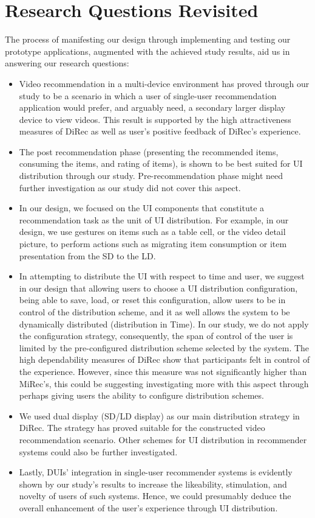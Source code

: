 \section{Research Questions Revisited} 
The process of manifesting our design through implementing and testing our
prototype applications, augmented with the achieved study results, aid us in
answering our research questions:
\begin{itemize}
  \item Video recommendation in a multi-device environment has proved through 
  our study to be a scenario in which a user of single-user recommendation
  application would prefer, and arguably need, a secondary larger display device
  to view videos. This result is supported by the high attractiveness measures
  of DiRec as well as user's positive feedback of DiRec's experience.
  \item The post recommendation phase (presenting the recommended items,
  consuming the items, and rating of items), is shown to be best suited for UI
  distribution through our study. Pre-recommendation phase might need further
  investigation as our study did not cover this aspect.
  \item In our design, we focused on the UI components that constitute a
  recommendation task as the unit of UI distribution. For example, in our
  design, we use gestures on items such as a table cell, or the video detail
  picture, to perform actions such as migrating item consumption or item
  presentation from the SD to the LD.
  \item In attempting to distribute the UI with respect to time and user, we
  suggest in our design that allowing users to choose a UI distribution
  configuration, being able to save, load, or reset this configuration, allow
  users to be in control of the distribution scheme, and it as well allows the
  system to be dynamically distributed (distribution in Time). In our study, we
  do not apply the configuration strategy, consequently, the span of control of
  the user is limited by the pre-configured distribution scheme selected by the
  system. The high dependability measures of DiRec show that participants felt
  in control of the experience. However, since this measure was not
  significantly higher than MiRec's, this could be suggesting investigating more
  with this aspect through perhaps giving users the ability to configure
  distribution schemes.
  \item We used dual display (SD/LD display) as our main distribution strategy
  in DiRec. The strategy has proved suitable for the constructed video
  recommendation scenario. Other schemes for UI distribution in recommender
  systems could also be further investigated.
  \item Lastly, DUIs' integration in single-user recommender systems is
  evidently shown by our study's results to increase the likeability,
  stimulation, and novelty of users of such systems. Hence, we could presumably
  deduce the overall enhancement of the user's experience through UI
  distribution.
\end{itemize}

